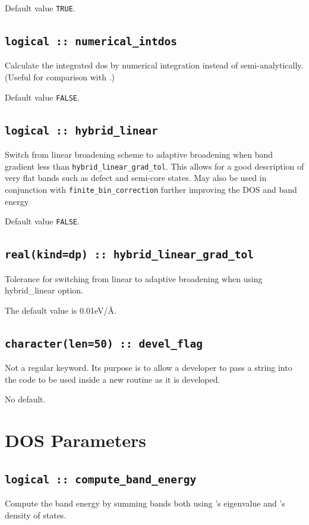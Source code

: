 \documentclass[a4paper,11pt,twoside]{book}
\begin{document}
{Default value \verb#TRUE#.

\subsection[numerical\_intdos]{\tt logical :: numerical\_intdos}
Calculate the integrated dos by numerical integration instead of semi-analytically. (Useful for comparison with \lindos.)

Default value \verb#FALSE#.

\subsection[hybrid\_linear]{\tt logical :: hybrid\_linear}
Switch from linear broadening scheme to adaptive broadening when band gradient less than \verb#hybrid_linear_grad_tol#. 
This allows for a good description of very flat bands such as defect and semi-core states. May also be used in conjunction 
with \verb#finite_bin_correction# further improving the DOS and band energy

Default value \verb#FALSE#.

\subsection[hybrid\_linear\_grad\_tol]{\tt real(kind=dp) :: hybrid\_linear\_grad\_tol}
Tolerance for switching from linear to adaptive broadening when using hybrid\_linear option.

The default value is 0.01eV/\AA.


\subsection[devel\_flag]{\tt character(len=50) :: devel\_flag}

Not a regular keyword. Its purpose is to allow a developer to pass a
string into the code to be used inside a new routine as it is developed.

No default.



\section{DOS Parameters}

\subsection[compute\_band\_energy]{\tt logical :: compute\_band\_energy}
Compute the band energy by summing bands both using \castep's eigenvalue and \optados's density of states.

}
\end{document}
